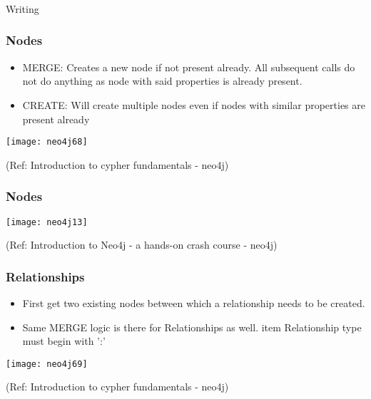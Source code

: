 \begin{frame}[fragile]\frametitle{}
\begin{center}
{\Large Writing}
\end{center}
\end{frame}



\begin{frame}[fragile]\frametitle{Nodes}

\begin{itemize}
\item MERGE: Creates a new node if not present already. All subsequent calls do not do anything as node with said properties is already present.

\item CREATE: Will create multiple nodes even if nodes with similar properties are present already
\end{itemize}

\begin{center}
\texttt{[image: neo4j68]}
\end{center}	  


{\tiny (Ref: Introduction to cypher fundamentals  - neo4j)}

\end{frame}

\begin{frame}[fragile]\frametitle{Nodes}


\begin{center}
\texttt{[image: neo4j13]}
\end{center}	  


{\tiny (Ref: Introduction to Neo4j - a hands-on crash course  - neo4j)}

\end{frame}


\begin{frame}[fragile]\frametitle{Relationships}

\begin{itemize}
\item First get two existing nodes between which a relationship needs to be created.
\item Same MERGE logic is there for Relationships as well.
item Relationship type must begin with ':'
\end{itemize}

\begin{center}
\texttt{[image: neo4j69]}
\end{center}	  


{\tiny (Ref: Introduction to cypher fundamentals  - neo4j)}

\end{frame}

